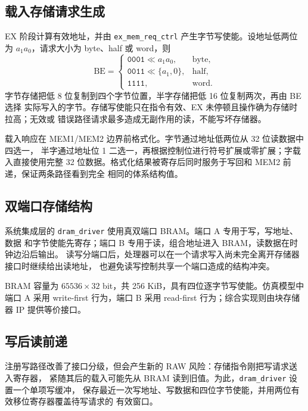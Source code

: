 \documentclass[UTF8,zihao=-4,a4paper]{ctexart}
\numberwithin{table}{section}
\numberwithin{figure}{section}
\newcommand{\code}[1]{\texttt{#1}}
\begin{document}
\subsection{载入存储请求生成}

EX 阶段计算有效地址，并由 \code{ex\_mem\_req\_ctrl} 产生字节写使能。设地址低两位
为 \(a_1a_0\)，请求大小为 byte、half 或 word，则
\begin{equation}
  \mathrm{BE}=\begin{cases}
    \mathtt{0001}\ll a_1a_0, & \text{byte},\\
    \mathtt{0011}\ll\{a_1,0\}, & \text{half},\\
    \mathtt{1111}, & \text{word}.
  \end{cases}
\end{equation}
字节存储把低 8 位复制到四个字节位置，半字存储把低 16 位复制两次，再由 BE 选择
实际写入的字节。存储写使能只在指令有效、EX 未停顿且操作确为存储时拉高；无效或
错误路径请求最多造成无副作用的读，不能写坏存储器。

载入响应在 MEM1/MEM2 边界前格式化。字节通过地址低两位从 32 位读数据中四选一，
半字通过地址位 1 二选一，再根据控制位进行符号扩展或零扩展；字载入直接使用完整
32 位数据。格式化结果被寄存后同时服务于写回和 MEM2 前递，保证两条路径看到完全
相同的体系结构值。

\subsection{双端口存储结构}

系统集成层的 \code{dram\_driver} 使用真双端口 BRAM。端口 A 专用于写，写地址、数据
和字节使能先寄存；端口 B 专用于读，组合地址进入 BRAM，读数据在时钟边沿后输出。
读写分端口后，处理器可以在一个请求写入尚未完全离开存储器接口时继续给出读地址，
也避免读写控制共享一个端口造成的结构冲突。

BRAM 容量为 \(65536\times32\) bit，共 256 KiB，具有四位逐字节写使能。仿真模型中
端口 A 采用 write-first 行为，端口 B 采用 read-first 行为；综合实现则由块存储器 IP
提供等价接口\cite{xilinx-bram}。

\subsection{写后读前递}

注册写路径改善了接口分级，但会产生新的 RAW 风险：存储指令刚把写请求送入寄存器，
紧随其后的载入可能先从 BRAM 读到旧值。为此，\code{dram\_driver} 设置一个单项写缓冲，
保存最近一次写地址、写数据和四位字节使能，并用两位有效移位寄存器覆盖待写请求的
有效窗口。
\end{document}

